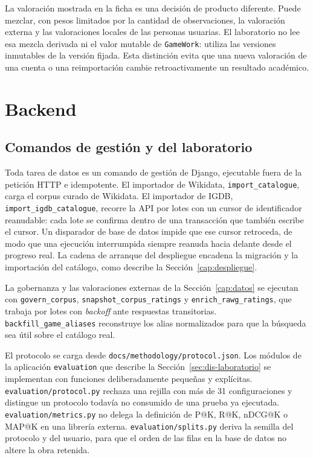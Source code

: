 La valoración mostrada en la ficha es una decisión de producto diferente. Puede mezclar,
con pesos limitados por la cantidad de observaciones, la valoración externa y las valoraciones
locales de las personas usuarias. El laboratorio no lee esa mezcla derivada ni el
valor mutable de \texttt{GameWork}: utiliza las versiones inmutables de la versión fijada. Esta
distinción evita que una nueva valoración de una cuenta o una reimportación cambie
retroactivamente un resultado académico.

\section{Backend}\label{sec:impl-backend}

\subsection{Comandos de gestión y del laboratorio}\label{sec:impl-comandos}

Toda tarea de datos es un comando de gestión de Django, ejecutable fuera de la petición HTTP e
idempotente. El importador de Wikidata, \texttt{import\_catalogue}, carga el corpus curado
de Wikidata. El importador de IGDB, \texttt{import\_igdb\_catalogue}, recorre la API por
lotes con un cursor de identificador reanudable: cada lote se confirma dentro de una
transacción que también escribe el cursor. Un disparador de base de datos impide que ese
cursor retroceda, de modo que una ejecución interrumpida siempre reanuda hacia delante desde
el progreso real. La cadena de arranque del despliegue encadena la migración y la importación del
catálogo, como describe la Sección~\ref{cap:despliegue}.

La gobernanza y las valoraciones externas de la Sección~\ref{cap:datos} se ejecutan con
\texttt{govern\_corpus}, \texttt{snapshot\_corpus\_ratings} y \texttt{enrich\_rawg\_ratings}, que
trabaja por lotes con \textit{backoff} ante respuestas transitorias.
\texttt{backfill\_game\_aliases} reconstruye los alias normalizados para que la búsqueda sea útil
sobre el catálogo real.

El protocolo se carga desde \texttt{docs/methodology/protocol.json}. Los módulos de la
aplicación \texttt{evaluation} que describe la Sección~\ref{sec:dis-laboratorio} se
implementan con funciones deliberadamente pequeñas y explícitas.
\texttt{evaluation/protocol.py} rechaza una rejilla con más de 31 configuraciones y distingue
un protocolo todavía no consumido de una prueba ya ejecutada. \texttt{evaluation/metrics.py} no
delega la definición de P@K, R@K, nDCG@K o MAP@K en una librería externa.
\texttt{evaluation/splits.py} deriva la semilla del protocolo y del usuario, para que el orden
de las filas en la base de datos no altere la obra retenida.

